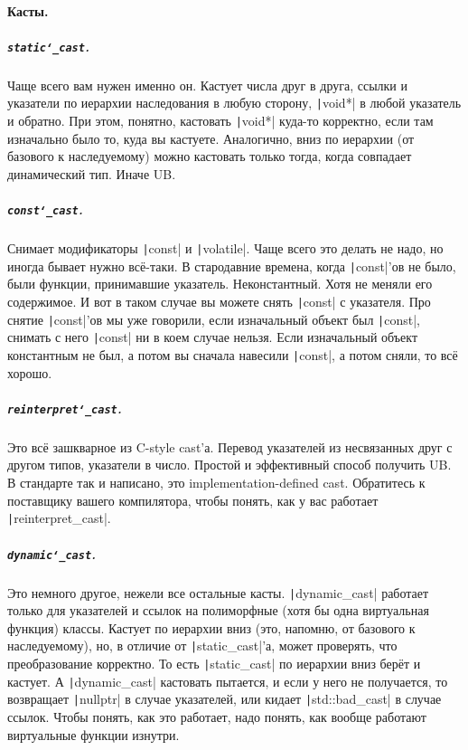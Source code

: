 \documentclass{article}
\begin{document}
    \paragraph{Касты.}
    \subparagraph{\texttt{static\char`_cast}.} Чаще всего вам нужен именно он. Кастует числа друг в друга, ссылки и указатели по иерархии наследования в любую сторону, \texttt|void*| в любой указатель и обратно. При этом, понятно, кастовать \texttt|void*| куда-то корректно, если там изначально было то, куда вы кастуете. Аналогично, вниз по иерархии (от базового к наследуемому) можно кастовать только тогда, когда совпадает динамический тип. Иначе UB.
    \subparagraph{\texttt{const\char`_cast}.} Снимает модификаторы \texttt|const| и \texttt|volatile|. Чаще всего это делать не надо, но иногда бывает нужно всё-таки. В стародавние времена, когда \texttt|const|'ов не было, были функции, принимавшие указатель. Неконстантный. Хотя не меняли его содержимое. И вот в таком случае вы можете снять \texttt|const| с указателя. Про снятие \texttt|const|'ов мы уже говорили, если изначальный объект был \texttt|const|, снимать с него \texttt|const| ни в коем случае нельзя. Если изначальный объект константным не был, а потом вы сначала навесили \texttt|const|, а потом сняли, то всё хорошо.
    \subparagraph{\texttt{reinterpret\char`_cast}.} Это всё зашкварное из C-style cast'а. Перевод указателей из несвязанных друг с другом типов, указатели в число. Простой и эффективный способ получить UB. В стандарте так и написано, это implementation-defined cast. Обратитесь к поставщику вашего компилятора, чтобы понять, как у вас работает \texttt|reinterpret_cast|.
    \subparagraph{\texttt{dynamic\char`_cast}.} Это немного другое, нежели все остальные касты. \texttt|dynamic_cast| работает только для указателей и ссылок на полиморфные (хотя бы одна виртуальная функция) классы. Кастует по иерархии вниз (это, напомню, от базового к наследуемому), но, в отличие от \texttt|static_cast|'а, может проверять, что преобразование корректно. То есть \texttt|static_cast| по иерархии вниз берёт и кастует. А \texttt|dynamic_cast| кастовать пытается, и если у него не получается, то возвращает \texttt|nullptr| в случае указателей, или кидает \texttt|std::bad_cast| в случае ссылок. Чтобы понять, как это работает, надо понять, как вообще работают виртуальные функции изнутри.
\end{document}

